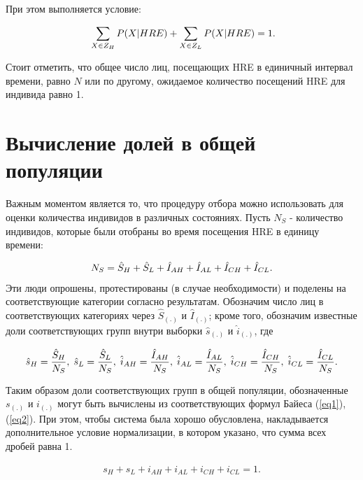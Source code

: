 \documentclass[a4paper]{report}
\begin{document}
	При этом выполняется условие:
	
	\begin{equation}\
	\sum_{X \in Z_H} P(X | HRE) +  \sum_{X \in Z_L} P(X | HRE) = 1. \notag 
	\end{equation}
	
	Стоит отметить, что общее число лиц, посещающих HRE в единичный интервал времени, равно $N$ или по другому, ожидаемое количество посещений HRE для индивида равно 1.
	
	\section{Вычисление долей в общей популяции}	
	
	Важным моментом является то, что процедуру отбора можно использовать для оценки количества индивидов в различных состояниях.
	Пусть $N_S$ - количество индивидов, которые были отобраны во время посещения HRE в единицу времени:
	
	\begin{gather}
	N_S = {\hat{S}_H} + {\hat{S}_L} + {\hat{I}_{AH}} + {\hat{I}_{AL}} + {\hat{I}_{CH}} + {\hat{I}_{CL}}. \notag
	\end{gather}
	Эти люди опрошены, протестированы (в случае необходимости) и поделены на соответствующие категории согласно результатам. Обозначим число лиц в соответствующих категориях через $\hat{S}_{(.)}$ и $\hat{I}_{(.)}$; кроме того, обозначим известные доли соответствующих групп внутри выборки $\hat{s}_{(.)}$ и $\hat{i}_{(.)}$, где
	
	\begin{gather}
	{\hat{s}_H} = {{\hat{S}_H} \over N_S}, \; {\hat{s}_L} = {{\hat{S}_L} \over N_S}, \; {\hat{i}_{AH}} = {{\hat{I}_{AH}} \over N_S}, \; {\hat{i}_{AL}} = {{\hat{I}_{AL}} \over N_S}, \; {\hat{i}_{CH}} = {{\hat{I}_{CH}} \over N_S}, \; {\hat{i}_{CL}} = {{\hat{I}_{CL}} \over N_S}. \notag
	\end{gather}
	
	
	
	Таким образом доли соответствующих групп в общей популяции, обозначенные $s_{(.)}$ и $i_{(.)}$ могут быть вычислены из соответствующих формул Байеса (\ref{eq1}), (\ref{eq2}). При этом, чтобы система была хорошо обусловлена, накладывается дополнительное условие нормализации, в котором указано, что сумма всех дробей равна 1.
	
	\begin{gather}
	{s}_H + {s}_L + {i}_{AH} + {i}_{AL} + {i}_{CH} + {i}_{CL} = 1.  \label{restr} 
	\end{gather}
	
\end{document}
